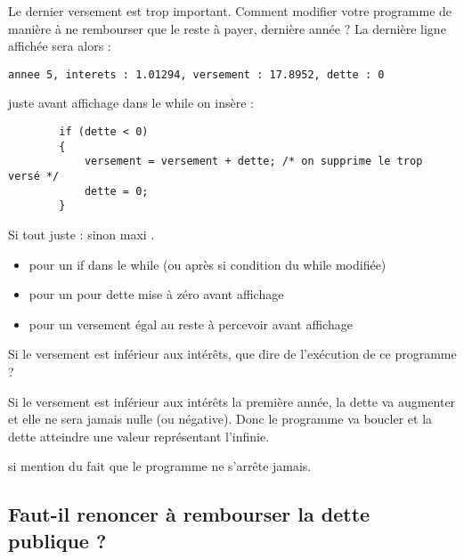\question Le dernier versement est trop important. Comment modifier
votre programme de manière à  ne rembourser que le reste à payer,
dernière année ? La dernière ligne affichée sera alors :
\begin{small}
\begin{verbatim}
annee 5, interets : 1.01294, versement : 17.8952, dette : 0
\end{verbatim}
\end{small}

\begin{correction}
juste avant affichage dans le while on insère :
  \begin{small}
\begin{verbatim}
        if (dette < 0)
        {
            versement = versement + dette; /* on supprime le trop versé */
            dette = 0;
        }
\end{verbatim}
  \end{small}
  
  \begin{baremeenv}
Si tout juste :  sinon maxi .
    \begin{itemize}
\item {} pour un if dans le while (ou après si condition du while
  modifiée)
\item {} pour un pour dette mise à zéro avant affichage
\item {} pour un versement égal au reste à percevoir avant affichage
\end{itemize}
  \end{baremeenv}
\end{correction}


\question Si le versement est inférieur aux intérêts, que dire de
l'exécution de ce programme ?

\begin{correction}
  Si le versement est inférieur aux intérêts la première année, la
  dette va augmenter et elle ne sera jamais nulle (ou négative). Donc
  le programme va boucler et la dette atteindre une valeur
  représentant l'infinie.

  \begin{baremeenv}
     si mention du fait que le programme ne s'arrête jamais.
  \end{baremeenv}
\end{correction}


\subsection{Faut-il renoncer à rembourser la dette publique ?}

